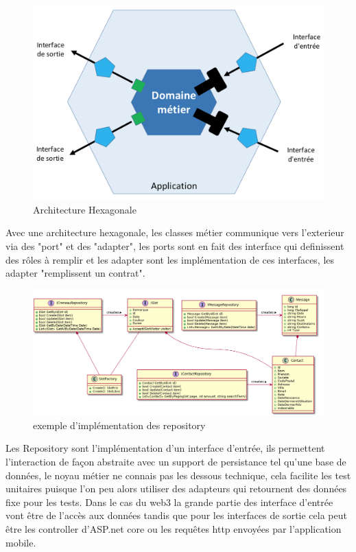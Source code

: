 \begin{figure}[!h]
    \centering
    \includegraphics[width=0.6\linewidth]{Images/hexarch}
    \caption{Architecture Hexagonale}
    \label{fig:archhexa}
\end{figure}

Avec une architecture hexagonale, les classes métier communique vers l'exterieur via des "port" et 
des "adapter", les ports sont en fait des interface qui definissent des rôles à remplir 
et les adapter sont les implémentation de ces interfaces, les adapter "remplissent un contrat".

\begin{figure}[h]
	\centering
	\includegraphics[width=1\linewidth]{Images/slotumlpart1}
	\caption{ exemple d'implémentation des repository }
	\label{fig:otherrepo}
\end{figure}

Les Repository sont l'implémentation d'un interface d'entrée, ils permettent l'interaction de façon 
abstraite avec un support de persistance tel qu'une base de données, le noyau métier ne connais pas 
les dessous technique, cela facilite les test unitaires puisque l'on peu alors utiliser 
des adapteurs qui retournent des données fixe pour les tests. Dans le cas du web3 la grande 
partie des interface d'entrée vont être de l'accès aux données tandis que pour les interfaces
de sortie cela peut être les controller d'ASP.net core ou les requêtes http envoyées 
par l'application mobile. \newline


